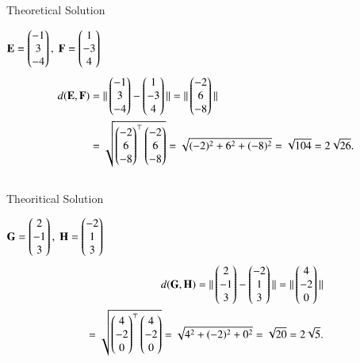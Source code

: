 \documentclass{beamer}
\begin{document}
\begin{frame}{Theoretical Solution}

$\mathbf{E} = \begin{pmatrix}-1\\3\\-4\end{pmatrix}, \;\mathbf{F} = \begin{pmatrix}1\\-3\\4\end{pmatrix}$
\begin{align*}
d(\mathbf{E},\mathbf{F}) &= \|\begin{pmatrix}-1\\3\\-4\end{pmatrix}-\begin{pmatrix}1\\-3\\4\end{pmatrix}\|
= \|\begin{pmatrix}-2\\6\\-8\end{pmatrix}\| \\
&= \sqrt{\begin{pmatrix}-2\\6\\-8\end{pmatrix}^\top\begin{pmatrix}-2\\6\\-8\end{pmatrix}} = \sqrt{(-2)^2+6^2+(-8)^2} = \sqrt{104} = 2\sqrt{26}. \\[10pt]
\end{align*}


\end{frame}


\begin{frame}{Theoritical Solution}

$\mathbf{G} = \begin{pmatrix}2\\-1\\3\end{pmatrix}, \;\mathbf{H} = \begin{pmatrix}-2\\1\\3\end{pmatrix}$
\begin{align*}
d(\mathbf{G},\mathbf{H}) = \|\begin{pmatrix}2\\-1\\3\end{pmatrix}-\begin{pmatrix}-2\\1\\3\end{pmatrix}\|
= \|\begin{pmatrix}4\\-2\\0\end{pmatrix}\|\\
= \sqrt{\begin{pmatrix}4\\-2\\0\end{pmatrix}^\top\begin{pmatrix}4\\-2\\0\end{pmatrix}} = \sqrt{4^2+(-2)^2+0^2} = \sqrt{20} = 2\sqrt{5}.
\end{align*}
\end{frame}
\end{document}
